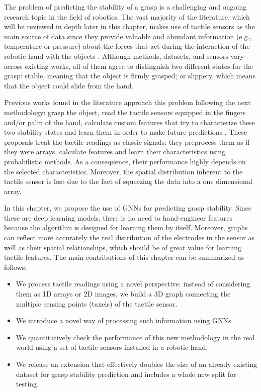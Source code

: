 The problem of predicting the stability of a grasp is a challenging and ongoing research topic in the field of robotics. The vast majority of the literature, which will be reviewed in depth later in this chapter, makes use of tactile sensors as the main source of data since they provide valuable and abundant information (e.g., temperature or pressure) about the forces that act during the interaction of the robotic hand with the objects \cite{Kappassov2015}. Although methods, datasets, and sensors vary across existing works, all of them agree to distinguish two different states for the grasp: stable, meaning that the object is firmly grasped; or slippery, which means that the object could slide from the hand.

Previous works found in the literature approach this problem following the next methodology: grasp the object, read the tactile sensors equipped in the fingers and/or palm of the hand, calculate custom features that try to characterize these two stability states and learn them in order to make future predictions \cite{Li2014b,Dang2014,Su2015b,Veiga2015}. These proposals treat the tactile readings as classic signals: they preprocess them as if they were arrays, calculate features and learn their characteristics using probabilistic methods. As a consequence, their performance highly depends on the selected characteristics. Moreover, the spatial distribution inherent to the tactile sensor is lost due to the fact of squeezing the data into a one dimensional array.

In this chapter, we propose the use of \acp{GNN} for predicting grasp stability. Since these are deep learning models, there is no need to hand-engineer features because the algorithm is designed for learning them by itself. Moreover, graphs can reflect more accurately the real distribution of the electrodes in the sensor as well as their spatial relationships, which should be of great value for learning tactile features. The main contributions of this chapter can be summarized as follows:

\begin{itemize}
	\item We process tactile readings using a novel perspective: instead of considering them as 1D arrays or 2D images, we build a 3D graph connecting the multiple sensing points (taxels) of the tactile sensor.

	\item We introduce a novel way of processing such information using \acfp{GNN}.
	
	\item We quantitatively check the performance of this new methodology in the real world using a set of tactile sensors installed in a robotic hand.

	\item We release an extension that effectively doubles the size of an already existing dataset \cite{Zapata2018} for grasp stability prediction and includes a whole new split for testing.
\end{itemize}


